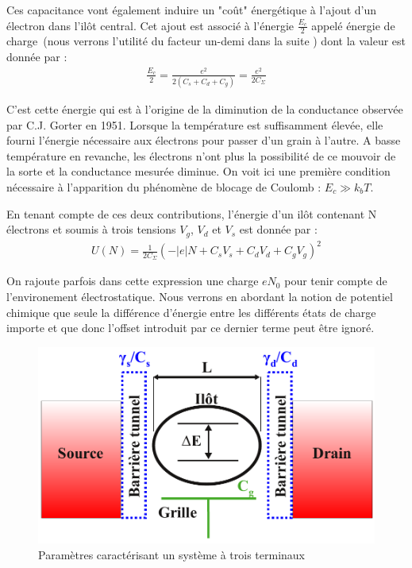 Ces capacitance vont également induire un "co\^ut" énergétique à l'ajout d'un électron dans l'il\^ot central. Cet ajout est associé à l'énergie $\frac{E_c}{2}$ appelé énergie de charge~(nous verrons l'utilité du facteur un-demi dans la suite ) dont la valeur est donnée par :
\begin{eqnarray}
\frac{E_c}{2} = \frac{e^2}{2(C_s+C_d+C_g)}=\frac{e^2}{2C_{\Sigma}} \nonumber
\end{eqnarray}


C'est cette énergie qui est à l'origine de la diminution de la conductance observée par C.J. Gorter en 1951. Lorsque la température est suffisamment élevée, elle fourni l'énergie nécessaire aux électrons pour passer d'un grain à l'autre. A basse température en revanche, les électrons n'ont plus la possibilité de ce mouvoir de la sorte et la conductance mesurée diminue. On voit ici une première condition nécessaire à l'apparition du phénomène de blocage de Coulomb : $E_c \gg k_bT$.

En tenant compte de ces deux contributions, l'énergie d'un il\^ot contenant N électrons et soumis à trois tensions $V_g$, $V_d$ et $V_s$ est donnée par :
\begin{eqnarray}
U(N) = \frac{1}{2C_{\Sigma}} (-|e|N + C_sV_s + C_dV_d + C_gV_g)^2
\end{eqnarray}

On rajoute parfois dans cette expression une charge $eN_0$ pour tenir compte de l'environement électrostatique. Nous verrons en abordant la notion de potentiel chimique que seule la différence d'énergie entre les différents états de charge importe et que donc l'offset introduit par ce dernier terme peut \^etre ignoré.

\begin{figure}
\includegraphics[scale=1]{Theorie/Transport/figure1/figure1ThTr.pdf} 
\caption{Paramètres caractérisant un système à trois terminaux}
\label{description_systeme}
\end{figure}



